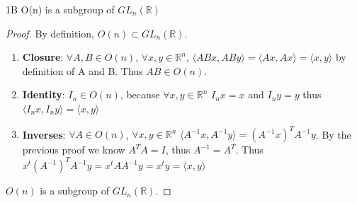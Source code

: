 \documentclass{article}
\newcommand{\R}{\mathbb{R}}
\newcommand{\angles}[1]{\langle{#1}\rangle}
\begin{document}
\begin{claim}{1B}
    O(n) is a subgroup of $GL_n(\R)$
\end{claim}
\begin{proof}
    By definition, $O(n) \subset GL_n(\R)$. 

    \begin{enumerate}{}
        \item \textbf{Closure}: $\forall A, B \in O(n)$, $\forall x, y \in \R^n$, $\angles{ABx, ABy} = \angles{Ax, Ax} = \angles{x, y}$ by definition of A and B. Thus $AB \in O(n)$.
        \item \textbf{Identity}: $I_n \in O(n)$, because $\forall x, y \in \R^n$ $I_n x = x$ and $I_n y = y$ thus $\angles{I_n x, I_n y} = \angles{x, y}$
        \item \textbf{Inverses}: $\forall A \in O(n)$, $\forall x, y \in \R^n$ $\angles{A^{-1}x, A^{-1}y } = (A^{-1}x)^TA^{-1}y$. By the previous proof we know $A^TA = I$, thus $A^{-1} = A^T$. Thus $x^t(A^{-1})^TA^{-1}y = x^t A A^{-1}y = x^t y = \angles{x, y}$
    \end{enumerate}

    $O(n)$ is a subgroup of $GL_n(\R)$. 
\end{proof}


\bigskip
\end{document}
